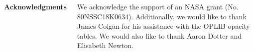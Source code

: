\documentclass[25pt, a0paper, portrait]{tikzposter}
\begin{document}
\begin{columns}
{\begin{minipage}[t]{0.33\linewidth}
			{\begin{center}
				\bf{\color{Dgreen}\large Acknowledgments}
			\end{center}}
			{
			\fontsize{23}{20}\selectfont
			We acknowledge the support of an NASA grant (No.
			80NSSC18K0634). Additionally, we would like to thank James
			Colgan for his assistance with the OPLIB opacity tables. We
			would also like to thank Aaron Dotter and Elisabeth Newton.
			}




			\end{minipage}%


		}

	\end{columns}
\end{document}
